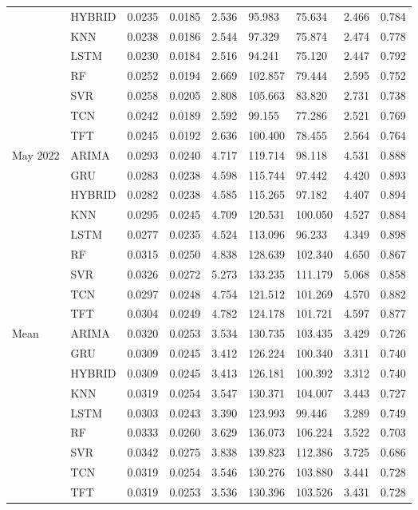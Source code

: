 \begin{tabular}{lllllllll}
 & HYBRID & 0.0235 & 0.0185 & 2.536 & 95.983 & 75.634 & 2.466 & 0.784 \\
 & KNN & 0.0238 & 0.0186 & 2.544 & 97.329 & 75.874 & 2.474 & 0.778 \\
 & LSTM & 0.0230 & 0.0184 & 2.516 & 94.241 & 75.120 & 2.447 & 0.792 \\
 & RF & 0.0252 & 0.0194 & 2.669 & 102.857 & 79.444 & 2.595 & 0.752 \\
 & SVR & 0.0258 & 0.0205 & 2.808 & 105.663 & 83.820 & 2.731 & 0.738 \\
 & TCN & 0.0242 & 0.0189 & 2.592 & 99.155 & 77.286 & 2.521 & 0.769 \\
 & TFT & 0.0245 & 0.0192 & 2.636 & 100.400 & 78.455 & 2.564 & 0.764 \\
May 2022 & ARIMA & 0.0293 & 0.0240 & 4.717 & 119.714 & 98.118 & 4.531 & 0.888 \\
 & GRU & 0.0283 & 0.0238 & 4.598 & 115.744 & 97.442 & 4.420 & 0.893 \\
 & HYBRID & 0.0282 & 0.0238 & 4.585 & 115.265 & 97.182 & 4.407 & 0.894 \\
 & KNN & 0.0295 & 0.0245 & 4.709 & 120.531 & 100.050 & 4.527 & 0.884 \\
 & LSTM & 0.0277 & 0.0235 & 4.524 & 113.096 & 96.233 & 4.349 & 0.898 \\
 & RF & 0.0315 & 0.0250 & 4.838 & 128.639 & 102.340 & 4.650 & 0.867 \\
 & SVR & 0.0326 & 0.0272 & 5.273 & 133.235 & 111.179 & 5.068 & 0.858 \\
 & TCN & 0.0297 & 0.0248 & 4.754 & 121.512 & 101.269 & 4.570 & 0.882 \\
 & TFT & 0.0304 & 0.0249 & 4.782 & 124.178 & 101.721 & 4.597 & 0.877 \\
Mean & ARIMA & 0.0320 & 0.0253 & 3.534 & 130.735 & 103.435 & 3.429 & 0.726 \\
 & GRU & 0.0309 & 0.0245 & 3.412 & 126.224 & 100.340 & 3.311 & 0.740 \\
 & HYBRID & 0.0309 & 0.0245 & 3.413 & 126.181 & 100.392 & 3.312 & 0.740 \\
 & KNN & 0.0319 & 0.0254 & 3.547 & 130.371 & 104.007 & 3.443 & 0.727 \\
 & LSTM & 0.0303 & 0.0243 & 3.390 & 123.993 & 99.446 & 3.289 & 0.749 \\
 & RF & 0.0333 & 0.0260 & 3.629 & 136.073 & 106.224 & 3.522 & 0.703 \\
 & SVR & 0.0342 & 0.0275 & 3.838 & 139.823 & 112.386 & 3.725 & 0.686 \\
 & TCN & 0.0319 & 0.0254 & 3.546 & 130.276 & 103.880 & 3.441 & 0.728 \\
 & TFT & 0.0319 & 0.0253 & 3.536 & 130.396 & 103.526 & 3.431 & 0.728 \\
\bottomrule
\end{tabular}
